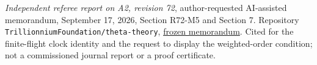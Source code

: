 \emph{Independent referee report on A2, revision 72},
author-requested AI-assisted memorandum, September 17, 2026,
Section R72-M5 and Section 7. Repository
\texttt{Trillionnium\allowbreak Foundation/\allowbreak theta-theory},
\href{https://github.com/TrillionniumFoundation/theta-theory/blob/c6715aff47ad6e8180acfa7ba229fd680e795293/reviews/a2-v72-independent-harsh-top4-2026-09-17/REFEREE_REPORT.md}{frozen memorandum}.
Cited for the finite-flight clock identity and the request to display the
weighted-order condition; not a commissioned journal report or a proof
certificate.
